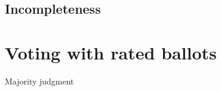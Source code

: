 \subsection{Incompleteness}

\section{Voting with rated ballots}
\label{sec:judgmentballots}
\begin{genthm}{Majority judgment}
	
\end{genthm}













